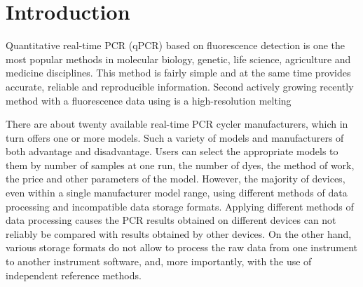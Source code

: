 \documentclass{bioinfo}
\begin{document}
\section{Introduction}

Quantitative real-time PCR (qPCR) based on fluorescence detection is one the 
most popular methods in molecular biology, genetic, life science, agriculture 
and medicine disciplines. This method is fairly simple and at the same time 
provides accurate, reliable and reproducible 
information\cite{kubista_real-time_2006}. Second actively growing recently 
method with a fluorescence data using is a high-resolution melting 
\cite{reed_high-resolution_2007}\cite{wittwer_high-resolution_2009}

There are about twenty available real-time PCR cycler manufacturers, which in 
turn offers one or more models. Such a variety of models and manufacturers of 
both advantage and disadvantage. Users can select the appropriate models to them 
by number of samples at one run, the number of dyes, the method of work, the 
price and other parameters of the model. However, the majority of devices, even 
within a single manufacturer model range, using different methods of data 
processing and incompatible data storage formats. Applying different methods of 
data processing causes the PCR results obtained on different devices can not 
reliably be compared with results obtained by other devices. On the other hand, 
various storage formats do not allow to process the raw data from one instrument 
to another instrument software, and, more importantly, with the use of 
independent reference methods.
\end{document}
